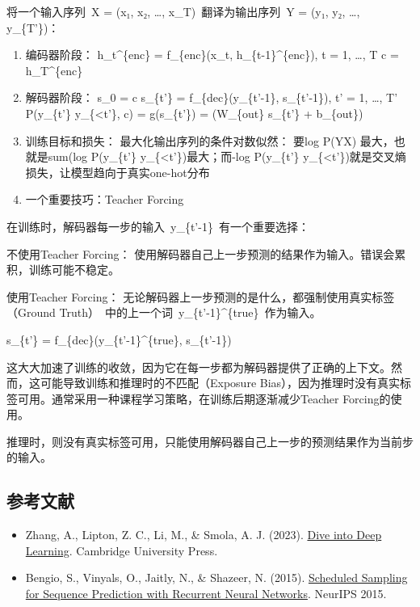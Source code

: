 将一个输入序列~X = (x₁, x₂, \ldots, x\_T)~翻译为输出序列~Y = (y₁, y₂, \ldots, y\_\{T'\})：

\begin{enumerate}
\def\labelenumi{\arabic{enumi}.}
\item
{}
  编码器阶段：
  h\_t\^{}\{enc\} = f\_\{enc\}(x\_t, h\_\{t-1\}\^{}\{enc\}), \quad {} t = 1, \ldots, T
  c = h\_T\^{}\{enc\}
\item
{}
  解码器阶段：
  s\_0 = c
  s\_\{t'\} = f\_\{dec\}(y\_\{t'-1\}, s\_\{t'-1\}), \quad {} t' = 1, \ldots, T'
  P(y\_\{t'\} \textbar{} y\_\{\textless t'\}, c) = g(s\_\{t'\}) = (W\_\{out\} s\_\{t'\} + b\_\{out\})
\item
{}
  训练目标和损失：
  最大化输出序列的条件对数似然：
  要log P(Y\textbar X) 最大，也就是sum(log P(y\_\{t'\} \textbar{} y\_\{\textless t'\})最大；而-log P(y\_\{t'\} \textbar{} y\_\{\textless t'\})就是交叉熵损失，让模型趋向于真实one-hot分布
\item
  一个重要技巧：Teacher Forcing
\end{enumerate}

在训练时，解码器每一步的输入~y\_\{t'-1\}~有一个重要选择：

不使用Teacher Forcing： 使用解码器自己上一步预测的结果作为输入。错误会累积，训练可能不稳定。

使用Teacher Forcing： 无论解码器上一步预测的是什么，都强制使用真实标签（Ground Truth）~中的上一个词~y\_\{t'-1\}\^{}\{true\}~作为输入。

s\_\{t'\} = f\_\{dec\}(y\_\{t'-1\}\^{}\{true\}, s\_\{t'-1\})

这大大加速了训练的收敛，因为它在每一步都为解码器提供了正确的上下文。然而，这可能导致训练和推理时的不匹配（Exposure Bias），因为推理时没有真实标签可用。通常采用一种课程学习策略，在训练后期逐渐减少Teacher Forcing的使用。

推理时，则没有真实标签可用，只能使用解码器自己上一步的预测结果作为当前步的输入。

\FloatBarrier
{}
\hypertarget{ux53c2ux8003ux6587ux732e-19}{%
\subsection{参考文献}\label{ux53c2ux8003ux6587ux732e-19}}

\vspace{0.25em}
\begin{itemize}
\tightlist
\item
  Zhang, A., Lipton, Z. C., Li, M., \& Smola, A. J. (2023). \href{https://D2L.ai}{Dive into Deep Learning}. Cambridge University Press.
\item
  Bengio, S., Vinyals, O., Jaitly, N., \& Shazeer, N. (2015). \href{https://proceedings.neurips.cc/paper/2015/hash/e995f98d56967d946471af29d7bf99f1-Abstract.html}{Scheduled Sampling for Sequence Prediction with Recurrent Neural Networks}. NeurIPS 2015.
\end{itemize}

\clearpage
